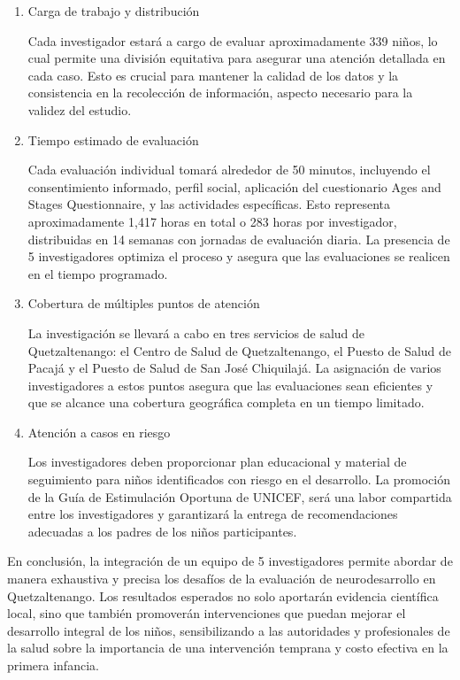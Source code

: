 \documentclass[11pt,letterpaper]{report}
\begin{document}
\begin{enumerate}
    \item Carga de trabajo y distribución

Cada investigador estará a cargo de evaluar aproximadamente 339 niños, lo cual
permite una división equitativa para asegurar una atención detallada en cada
caso. Esto es crucial para mantener la calidad de los datos y la consistencia
en la recolección de información, aspecto necesario para la validez del
estudio.

	\item Tiempo estimado de evaluación

Cada evaluación individual tomará alrededor de 50 minutos, incluyendo el
consentimiento informado, perfil social, aplicación del cuestionario Ages and
Stages Questionnaire, y las actividades específicas. Esto representa
aproximadamente 1,417 horas en total o 283 horas por investigador, distribuidas
en 14 semanas con jornadas de evaluación diaria. La presencia de 5
investigadores optimiza el proceso y asegura que las evaluaciones se realicen
en el tiempo programado.
	
	\item Cobertura de múltiples puntos de atención

La investigación se llevará a cabo en tres servicios de salud de Quetzaltenango:
el Centro de Salud de Quetzaltenango, el Puesto de Salud de Pacajá y el Puesto
de Salud de San José Chiquilajá. La asignación de varios investigadores a estos
puntos asegura que las evaluaciones sean eficientes y que se alcance una
cobertura geográfica completa en un tiempo limitado.

	\item Atención a casos en riesgo

Los investigadores deben proporcionar plan educacional y material de
seguimiento para niños identificados con riesgo en el desarrollo. La promoción
de la Guía de Estimulación Oportuna de UNICEF, será una labor compartida entre
los investigadores y garantizará la entrega de recomendaciones adecuadas a los
padres de los niños participantes.

\end{enumerate}

En conclusión, la integración de un equipo de 5 investigadores permite abordar
de manera exhaustiva y precisa los desafíos de la evaluación de neurodesarrollo
en Quetzaltenango. Los resultados esperados no solo aportarán evidencia
científica local, sino que también promoverán intervenciones que puedan mejorar
el desarrollo integral de los niños, sensibilizando a las autoridades y
profesionales de la salud sobre la importancia de una intervención temprana y
costo efectiva en la primera infancia.
\end{document}
